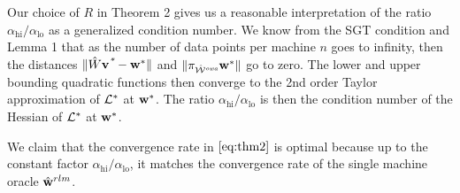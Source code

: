 \documentclass[thesis.tex]{subfiles}
\newcommand{\qhi}{\alpha_\text{hi}}
\newcommand{\qlo}{\alpha_\text{lo}}
\begin{document}
Our choice of $R$ in Theorem 2 gives us a reasonable interpretation of the ratio $\qhi/\qlo$ as a generalized condition number.
We know from the SGT condition and Lemma 1 that as the number of data points per machine $n$ goes to infinity,
then the distances ${\lVert {\hat W\mathbf{v}^{\textit{*}}-{\mathbf w^{*}}} \rVert}$ and ${\lVert {\pi_{{{\hat {{\mathcal W}}^{\textit{owa}}}}}{\mathbf w^{*}}} \rVert}$ go to zero.
The lower and upper bounding quadratic functions then converge to the 2nd order Taylor approximation of $\mathcal{L}^*$ at ${\mathbf w^{*}}$.
The ratio $\qhi/\qlo$ is then the condition number of the Hessian of $\mathcal{L}^*$ at ${\mathbf w^{*}}$.

We claim that the convergence rate in $\eqref{eq:thm2}$ is optimal because up to the constant factor $\qhi/\qlo$, it matches the convergence rate of the single machine oracle $\hat{\mathbf w}^{rlm}$.


\end{document}
